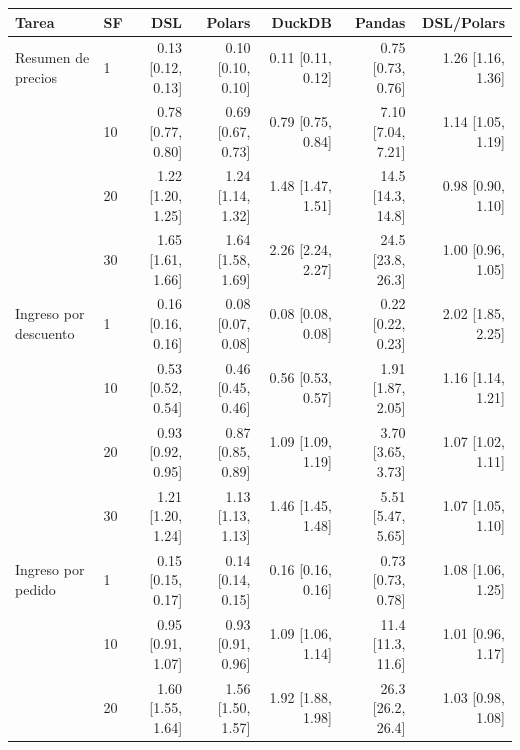 \begin{tabular}{@{}llrrrrr@{}}
\toprule
Tarea & SF & DSL & Polars & DuckDB & Pandas & DSL/Polars \\
\midrule
Resumen de precios & 1 & 0.13 {\scriptsize[0.12, 0.13]} & 0.10 {\scriptsize[0.10, 0.10]} & 0.11 {\scriptsize[0.11, 0.12]} & 0.75 {\scriptsize[0.73, 0.76]} & 1.26 {\scriptsize[1.16, 1.36]} \\
 & 10 & 0.78 {\scriptsize[0.77, 0.80]} & 0.69 {\scriptsize[0.67, 0.73]} & 0.79 {\scriptsize[0.75, 0.84]} & 7.10 {\scriptsize[7.04, 7.21]} & 1.14 {\scriptsize[1.05, 1.19]} \\
 & 20 & 1.22 {\scriptsize[1.20, 1.25]} & 1.24 {\scriptsize[1.14, 1.32]} & 1.48 {\scriptsize[1.47, 1.51]} & 14.5 {\scriptsize[14.3, 14.8]} & 0.98 {\scriptsize[0.90, 1.10]} \\
 & 30 & 1.65 {\scriptsize[1.61, 1.66]} & 1.64 {\scriptsize[1.58, 1.69]} & 2.26 {\scriptsize[2.24, 2.27]} & 24.5 {\scriptsize[23.8, 26.3]} & 1.00 {\scriptsize[0.96, 1.05]} \\
\midrule
Ingreso por descuento & 1 & 0.16 {\scriptsize[0.16, 0.16]} & 0.08 {\scriptsize[0.07, 0.08]} & 0.08 {\scriptsize[0.08, 0.08]} & 0.22 {\scriptsize[0.22, 0.23]} & 2.02 {\scriptsize[1.85, 2.25]} \\
 & 10 & 0.53 {\scriptsize[0.52, 0.54]} & 0.46 {\scriptsize[0.45, 0.46]} & 0.56 {\scriptsize[0.53, 0.57]} & 1.91 {\scriptsize[1.87, 2.05]} & 1.16 {\scriptsize[1.14, 1.21]} \\
 & 20 & 0.93 {\scriptsize[0.92, 0.95]} & 0.87 {\scriptsize[0.85, 0.89]} & 1.09 {\scriptsize[1.09, 1.19]} & 3.70 {\scriptsize[3.65, 3.73]} & 1.07 {\scriptsize[1.02, 1.11]} \\
 & 30 & 1.21 {\scriptsize[1.20, 1.24]} & 1.13 {\scriptsize[1.13, 1.13]} & 1.46 {\scriptsize[1.45, 1.48]} & 5.51 {\scriptsize[5.47, 5.65]} & 1.07 {\scriptsize[1.05, 1.10]} \\
\midrule
Ingreso por pedido & 1 & 0.15 {\scriptsize[0.15, 0.17]} & 0.14 {\scriptsize[0.14, 0.15]} & 0.16 {\scriptsize[0.16, 0.16]} & 0.73 {\scriptsize[0.73, 0.78]} & 1.08 {\scriptsize[1.06, 1.25]} \\
 & 10 & 0.95 {\scriptsize[0.91, 1.07]} & 0.93 {\scriptsize[0.91, 0.96]} & 1.09 {\scriptsize[1.06, 1.14]} & 11.4 {\scriptsize[11.3, 11.6]} & 1.01 {\scriptsize[0.96, 1.17]} \\
 & 20 & 1.60 {\scriptsize[1.55, 1.64]} & 1.56 {\scriptsize[1.50, 1.57]} & 1.92 {\scriptsize[1.88, 1.98]} & 26.3 {\scriptsize[26.2, 26.4]} & 1.03 {\scriptsize[0.98, 1.08]} \\

\end{tabular}
